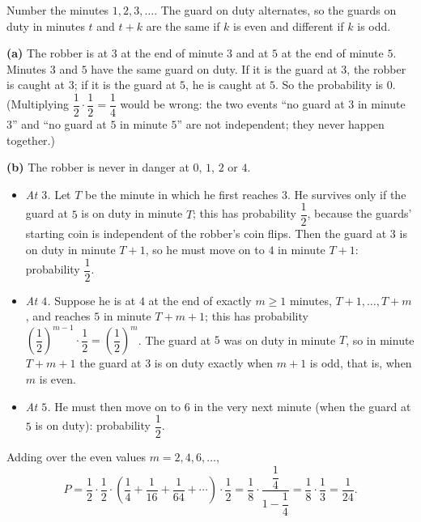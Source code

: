 Number the minutes $1,2,3,\dots$. The guard on duty alternates, so the guards on duty in minutes $t$ and $t+k$ are the same if $k$ is even and different if $k$ is odd.

\textbf{(a)} The robber is at $3$ at the end of minute $3$ and at $5$ at the end of minute $5$. Minutes $3$ and $5$ have the same guard on duty. If it is the guard at $3$, the robber is caught at $3$; if it is the guard at $5$, he is caught at $5$. So the probability is $\boxed{0}$. (Multiplying $\dfrac{1}{2}\cdot\dfrac{1}{2}=\dfrac{1}{4}$ would be wrong: the two events ``no guard at $3$ in minute $3$'' and ``no guard at $5$ in minute $5$'' are not independent; they never happen together.)

\textbf{(b)} The robber is never in danger at $0$, $1$, $2$ or $4$.
\begin{itemize}
\item \emph{At $3$.} Let $T$ be the minute in which he first reaches $3$. He survives only if the guard at $5$ is on duty in minute $T$; this has probability $\dfrac{1}{2}$, because the guards' starting coin is independent of the robber's coin flips. Then the guard at $3$ is on duty in minute $T+1$, so he must move on to $4$ in minute $T+1$: probability $\dfrac{1}{2}$.
\item \emph{At $4$.} Suppose he is at $4$ at the end of exactly $m\ge1$ minutes, $T+1,\dots,T+m$, and reaches $5$ in minute $T+m+1$; this has probability $\left(\dfrac{1}{2}\right)^{m-1}\cdot\dfrac{1}{2}=\left(\dfrac{1}{2}\right)^m$. The guard at $5$ was on duty in minute $T$, so in minute $T+m+1$ the guard at $3$ is on duty exactly when $m+1$ is odd, that is, when $m$ is even.
\item \emph{At $5$.} He must then move on to $6$ in the very next minute (when the guard at $5$ is on duty): probability $\dfrac{1}{2}$.
\end{itemize}
Adding over the even values $m=2,4,6,\dots$,
\[P=\dfrac{1}{2}\cdot\dfrac{1}{2}\cdot\left(\dfrac{1}{4}+\dfrac{1}{16}+\dfrac{1}{64}+\cdots\right)\cdot\dfrac{1}{2}=\dfrac{1}{8}\cdot\dfrac{\dfrac{1}{4}}{1-\dfrac{1}{4}}=\dfrac{1}{8}\cdot\dfrac{1}{3}=\boxed{\dfrac{1}{24}}.\]
